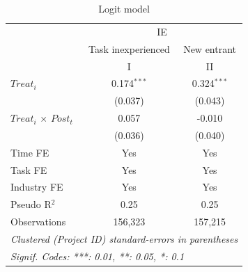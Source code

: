\documentclass[
]{article}
\begin{document}
\begin{table}[htbp]
   \caption{Logit model}
   \centering
   \small
   \begin{tabular}{lcc}
      \toprule
       & \multicolumn{2}{c}{IE}\\
                                   & Task inexperienced & New entrant \\   
      \midrule & I & II\\
      \midrule 
      $Treat_i$                    & 0.174$^{***}$      & 0.324$^{***}$\\   
                                   & (0.037)            & (0.043)\\   
      $Treat_i$ $\times$ $Post_t$  & 0.057              & -0.010\\   
                                   & (0.036)            & (0.040)\\   
      \midrule 
      Time FE                      & Yes                & Yes\\  
      Task FE                      & Yes                & Yes\\  
      Industry FE                  & Yes                & Yes\\  
      Pseudo R$^2$                 & 0.25               & 0.25\\  
      Observations                 & 156,323            & 157,215\\  
      \midrule
      \multicolumn{3}{l}{\emph{Clustered (Project ID) standard-errors in parentheses}}\\
      \multicolumn{3}{l}{\emph{Signif. Codes: ***: 0.01, **: 0.05, *: 0.1}}\\
   \end{tabular}
\end{table}
\begingroup
\centering
\small
\end{document}
